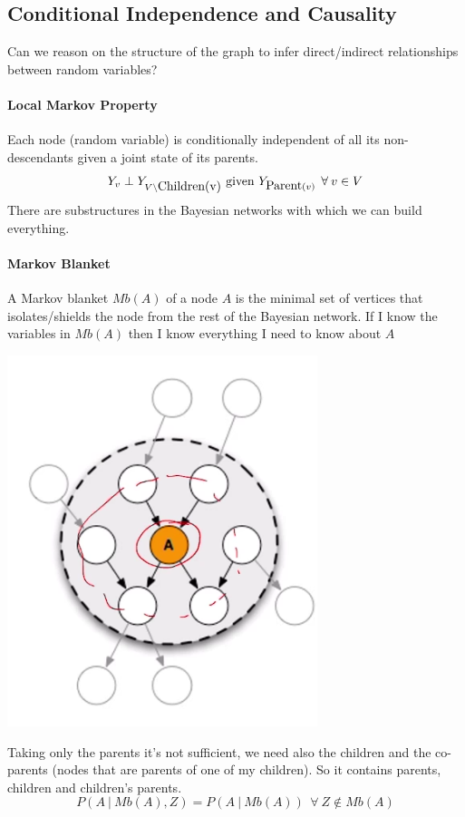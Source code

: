\documentclass[10pt]{report}
\begin{document}
\subsection{Conditional Independence and Causality}
Can we reason on the structure of the graph to infer direct/indirect relationships between random variables?
\paragraph{Local Markov Property} Each node (random variable) is conditionally independent of all its non-descendants given a joint state of its parents. $$Y_v\perp Y_{V\setminus \hbox{Children(v)}}\hbox{ given }Y_{\hbox{Parent}(v)}\:\:\forall\:v\in V$$
There are substructures in the Bayesian networks with which we can build everything.
\paragraph{Markov Blanket} A Markov blanket $Mb(A)$ of a node $A$ is the minimal set of vertices that isolates/shields the node from the rest of the Bayesian network. If I know the variables in $Mb(A)$ then I know everything I need to know about $A$\begin{center}
	\includegraphics[scale=0.5]{19.png}
\end{center}
Taking only the parents it's not sufficient, we need also the children and the co-parents (nodes that are parents of one of my children). So it contains parents, children and children's parents.
$$P(A\:|\:Mb(A), Z) = P(A\:|\:Mb(A))\:\:\forall\:Z\not\in Mb(A)$$
\end{document}
